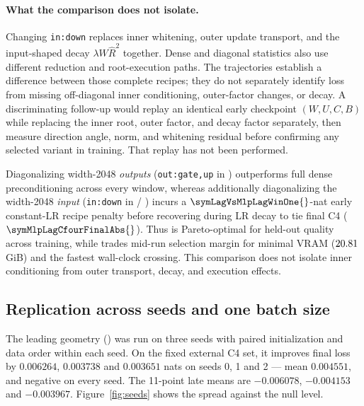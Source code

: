 \paragraph{What the comparison does not isolate.}
Changing \texttt{in:down} replaces inner whitening, outer update transport,
and the input-shaped decay $\lambda W\hat R^2$ together. Dense and diagonal
statistics also use different reduction and root-execution paths. The
trajectories establish a difference between those complete recipes; they do
not separately identify loss from missing off-diagonal inner conditioning,
outer-factor changes, or decay. A discriminating follow-up would replay an
identical early checkpoint $(W,U,C,B)$ while replacing the inner root, outer
factor, and decay factor separately, then measure direction angle, norm, and
whitening residual before confirming any selected variant in training.
That replay has not been performed.

\begin{finding}
Diagonalizing width-2048 \emph{outputs} (\texttt{out:gate,up} in )
outperforms full dense preconditioning across every window, whereas
additionally diagonalizing the width-2048 \emph{input} (\texttt{in:down} in
 / ) incurs a $\symLagVsMlpLagWinOne{}$-nat
early constant-LR recipe penalty before recovering during LR decay to tie
final C4 ($\symMlpLagCfourFinalAbs{}$). Thus  is Pareto-optimal
for held-out quality across training, while  trades mid-run
selection margin for minimal VRAM ($20.81$\,GiB) and the fastest
wall-clock crossing. This comparison does not isolate inner conditioning from
outer transport, decay, and execution effects.
\end{finding}

\subsection{Replication across seeds and one batch size}
\label{sec:replication}

The leading geometry () was run on three seeds with paired
initialization and data order within each seed. On the fixed external C4 set, it
improves final loss by $0.006264$, $0.003738$ and $0.003651$ nats on seeds 0, 1
and 2 --- mean $0.004551$, and negative on every seed. The 11-point late means
are $-0.006078$, $-0.004153$ and $-0.003967$. Figure~\ref{fig:seeds} shows the
spread against the null level.

